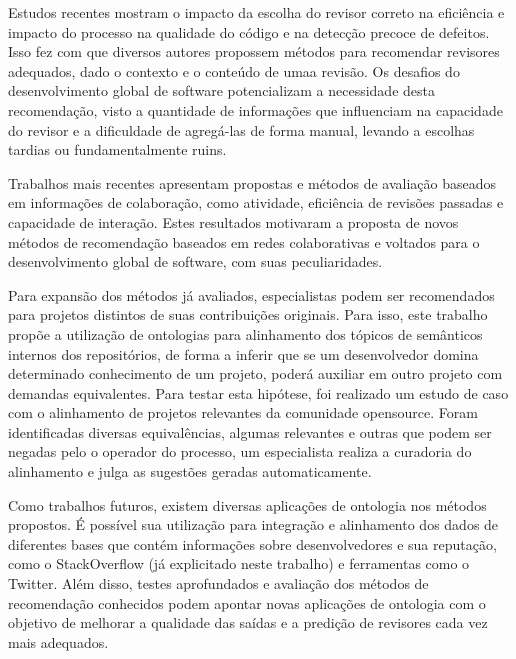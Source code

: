 \documentclass[sigconf]{acmart}
\begin{document}
Estudos recentes mostram o impacto da escolha do revisor correto na eficiência e impacto do processo na qualidade do código e na detecção precoce de defeitos. Isso fez com que diversos autores propossem métodos para recomendar revisores adequados, dado o contexto e o conteúdo de umaa revisão. Os desafios do desenvolvimento global de software potencializam a necessidade desta recomendação, visto a quantidade de informações que influenciam na capacidade do revisor e a dificuldade de agregá-las de forma manual, levando a escolhas tardias ou fundamentalmente ruins.

Trabalhos mais recentes apresentam propostas e métodos de avaliação baseados em informações de colaboração, como atividade, eficiência de revisões passadas e capacidade de interação. Estes resultados motivaram a proposta de novos métodos de recomendação baseados em redes colaborativas e voltados para o desenvolvimento global de software, com suas peculiaridades.

Para expansão dos métodos já avaliados, especialistas podem ser recomendados para projetos distintos de suas contribuições originais. Para isso, este trabalho propõe a utilização de ontologias para alinhamento dos tópicos de semânticos internos dos repositórios, de forma a inferir que se um desenvolvedor domina determinado conhecimento de um projeto, poderá auxiliar em outro projeto com demandas equivalentes. Para testar esta hipótese, foi realizado um estudo de caso com o alinhamento de projetos relevantes da comunidade opensource. Foram identificadas diversas equivalências, algumas relevantes e outras que podem ser negadas pelo o operador do processo, um especialista realiza a curadoria do alinhamento e julga as sugestões geradas automaticamente.

Como trabalhos futuros, existem diversas aplicações de ontologia nos métodos propostos. É possível sua utilização para integração e alinhamento dos dados de diferentes bases que contém informações sobre desenvolvedores e sua reputação, como o StackOverflow (já explicitado neste trabalho) e ferramentas como o Twitter. Além disso, testes aprofundados e avaliação dos métodos de recomendação conhecidos podem apontar novas aplicações de ontologia com o objetivo de melhorar a qualidade das saídas e a predição de revisores cada vez mais adequados.



\end{document}
